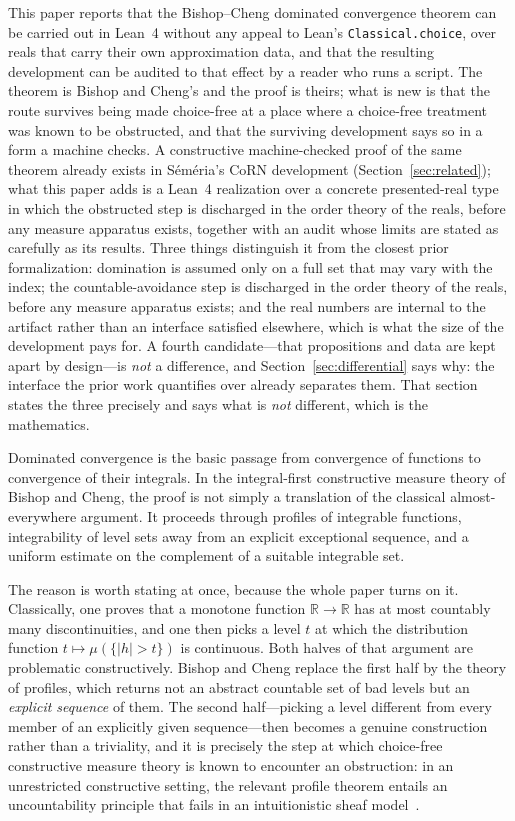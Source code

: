 \documentclass[11pt]{article}
\theoremstyle{definition}
\theoremstyle{remark}
\begin{document}
This paper reports that the Bishop--Cheng dominated convergence theorem can be
carried out in Lean~4 without any appeal to Lean's \texttt{Classical.choice}, over
reals that carry their own approximation data, and that the resulting development
can be audited to that effect by a reader who runs a script.  The theorem is Bishop
and Cheng's and the proof is theirs; what is new is that the route survives being
made choice-free at a place where a choice-free treatment was known to be obstructed,
and that the surviving development says so in a form a machine checks.  A
constructive machine-checked proof of the same theorem already exists in
S\'em\'eria's CoRN development (Section~\ref{sec:related}); what this paper adds
is a Lean~4 realization over a concrete presented-real type in which the obstructed
step is discharged in the order theory of the reals, before any measure apparatus
exists, together with an audit whose limits are stated as carefully as its results.  Three things
distinguish it from the closest prior formalization: domination is assumed only on a
full set that may vary with the index; the countable-avoidance step is discharged in
the order theory of the reals, before any measure apparatus exists; and the real
numbers are internal to the artifact rather than an interface satisfied elsewhere,
which is what the size of the development pays for.  A fourth candidate---that
propositions and data are kept apart by design---is \emph{not} a difference, and
Section~\ref{sec:differential} says why: the interface the prior work quantifies
over already separates them.  That section states the three precisely and says what is
\emph{not} different, which is the mathematics.

Dominated convergence is the basic passage from convergence of functions to convergence of their integrals.  In the integral-first constructive measure theory of Bishop and Cheng, the proof is not simply a translation of the classical almost-everywhere argument.  It proceeds through profiles of integrable functions, integrability of level sets away from an explicit exceptional sequence, and a uniform estimate on the complement of a suitable integrable set.

The reason is worth stating at once, because the whole paper turns on it.  Classically, one proves that a monotone function $\mathbb{R}\to\mathbb{R}$ has at most countably many discontinuities, and one then picks a level $t$ at which the distribution function $t\mapsto\mu(\{|h|>t\})$ is continuous.  Both halves of that argument are problematic constructively.  Bishop and Cheng replace the first half by the theory of profiles, which returns not an abstract countable set of bad levels but an \emph{explicit sequence} of them.  The second half---picking a level different from every member of an explicitly given sequence---then becomes a genuine construction rather than a triviality, and it is precisely the step at which choice-free constructive measure theory is known to encounter an obstruction: in an unrestricted constructive setting, the relevant profile theorem entails an uncountability principle that fails in an intuitionistic sheaf model~\cite{spitters-2006-dagstuhl}.
\end{document}
